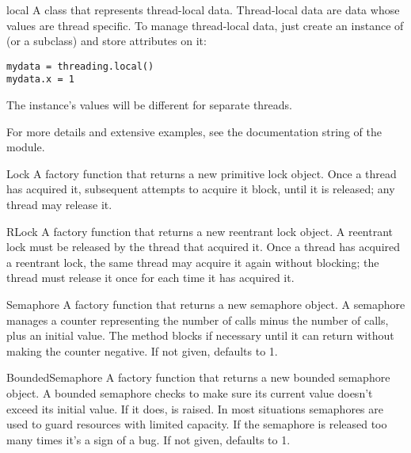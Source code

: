 \begin{classdesc*}{local}{}
A class that represents thread-local data.  Thread-local data are data
whose values are thread specific.  To manage thread-local data, just
create an instance of  (or a subclass) and store
attributes on it:

\begin{verbatim}
mydata = threading.local()
mydata.x = 1
\end{verbatim}

The instance's values will be different for separate threads.

For more details and extensive examples, see the documentation string
of the  module.

\end{classdesc*}

\begin{funcdesc}{Lock}{}
A factory function that returns a new primitive lock object.  Once
a thread has acquired it, subsequent attempts to acquire it block,
until it is released; any thread may release it.
\end{funcdesc}

\begin{funcdesc}{RLock}{}
A factory function that returns a new reentrant lock object.
A reentrant lock must be released by the thread that acquired it.
Once a thread has acquired a reentrant lock, the same thread may
acquire it again without blocking; the thread must release it once
for each time it has acquired it.
\end{funcdesc}

\begin{funcdesc}{Semaphore}{}
A factory function that returns a new semaphore object.  A
semaphore manages a counter representing the number of 
calls minus the number of  calls, plus an initial value.
The  method blocks if necessary until it can return
without making the counter negative.  If not given,  defaults to
1. 
\end{funcdesc}

\begin{funcdesc}{BoundedSemaphore}{}
A factory function that returns a new bounded semaphore object.  A bounded
semaphore checks to make sure its current value doesn't exceed its initial
value.  If it does,  is raised. In most situations
semaphores are used to guard resources with limited capacity.  If the
semaphore is released too many times it's a sign of a bug.  If not given,
 defaults to 1. 
\end{funcdesc}

